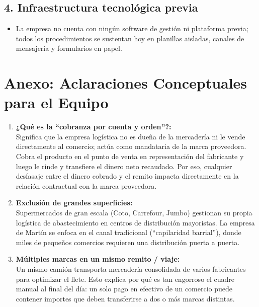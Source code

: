 \documentclass[11pt,a4paper]{article}
\begin{document}
\subsection*{4. Infraestructura tecnológica previa}
\begin{itemize}
  \item La empresa no cuenta con ningún software de gestión ni plataforma previa; todos los procedimientos se sustentan hoy en planillas aisladas, canales de mensajería y formularios en papel.
\end{itemize}

\section*{Anexo: Aclaraciones Conceptuales para el Equipo}

\begin{enumerate}[label=\textbf{\arabic*.}]
  \item \textbf{¿Qué es la ``cobranza por cuenta y orden''?:}\\
  Significa que la empresa logística no es dueña de la mercadería ni le vende directamente al comercio; actúa como mandataria de la marca proveedora. Cobra el producto en el punto de venta en representación del fabricante y luego le rinde y transfiere el dinero neto recaudado. Por eso, cualquier desfasaje entre el dinero cobrado y el remito impacta directamente en la relación contractual con la marca proveedora.

  \item \textbf{Exclusión de grandes superficies:}\\
  Supermercados de gran escala (Coto, Carrefour, Jumbo) gestionan su propia logística de abastecimiento en centros de distribución mayoristas. La empresa de Martín se enfoca en el canal tradicional (``capilaridad barrial''), donde miles de pequeños comercios requieren una distribución puerta a puerta.

  \item \textbf{Múltiples marcas en un mismo remito / viaje:}\\
  Un mismo camión transporta mercadería consolidada de varios fabricantes para optimizar el flete. Esto explica por qué es tan engorroso el cuadre manual al final del día: un solo pago en efectivo de un comercio puede contener importes que deben transferirse a dos o más marcas distintas.
\end{enumerate}

\label{LastPage}
\end{document}
